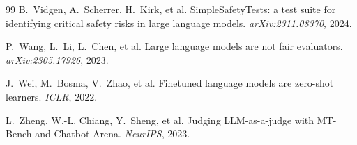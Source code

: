 \documentclass{article}
\begin{document}
\begin{thebibliography}{99}
B.~Vidgen, A.~Scherrer, H.~Kirk, et al.
\newblock SimpleSafetyTests: a test suite for identifying critical safety risks
in large language models.
\newblock \emph{arXiv:2311.08370}, 2024.

P.~Wang, L.~Li, L.~Chen, et al.
\newblock Large language models are not fair evaluators.
\newblock \emph{arXiv:2305.17926}, 2023.

J.~Wei, M.~Bosma, V.~Zhao, et al.
\newblock Finetuned language models are zero-shot learners.
\newblock \emph{ICLR}, 2022.

L.~Zheng, W.-L. Chiang, Y.~Sheng, et al.
\newblock Judging LLM-as-a-judge with MT-Bench and Chatbot Arena.
\newblock \emph{NeurIPS}, 2023.

\end{thebibliography}
\end{document}
